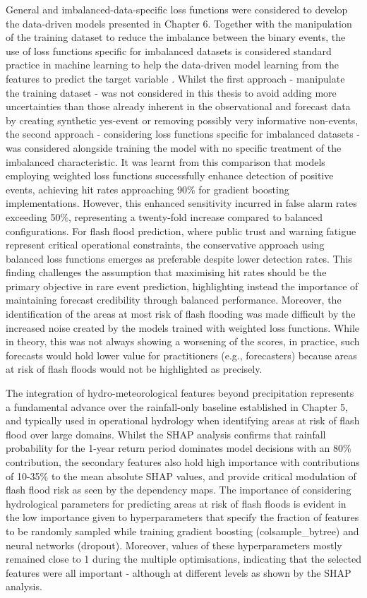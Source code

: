 General and imbalanced-data-specific loss functions were considered to develop the data-driven models presented in Chapter 6. Together with the manipulation of the training dataset to reduce the imbalance between the binary events, the use of loss functions specific for imbalanced datasets is considered standard practice in machine learning to help the data-driven model learning from the features to predict the target variable \citep{Altalhan_2025}. Whilst the first approach - manipulate the training dataset - was not considered in this thesis to avoid adding more uncertainties than those already inherent in the observational and forecast data by creating synthetic yes-event or removing possibly very informative non-events, the second approach - considering loss functions specific for imbalanced datasets - was considered alongside training the model with no specific treatment of the imbalanced characteristic. It was learnt from this comparison that models employing weighted loss functions successfully enhance detection of positive events, achieving hit rates approaching 90\% for gradient boosting implementations. However, this enhanced sensitivity incurred in false alarm rates exceeding 50\%, representing a twenty-fold increase compared to balanced configurations. For flash flood prediction, where public trust and warning fatigue represent critical operational constraints, the conservative approach using balanced loss functions emerges as preferable despite lower detection rates. This finding challenges the assumption that maximising hit rates should be the primary objective in rare event prediction, highlighting instead the importance of maintaining forecast credibility through balanced performance. Moreover, the identification of the areas at most risk of flash flooding was made difficult by the increased noise created by the models trained with weighted loss functions. While in theory, this was not always showing a worsening of the scores, in practice, such forecasts would hold lower value for practitioners (e.g., forecasters) because areas at risk of flash floods would not be highlighted as precisely. 

The integration of hydro-meteorological features beyond precipitation represents a fundamental advance over the rainfall-only baseline established in Chapter 5, and typically used in operational hydrology when identifying areas at risk of flash flood over large domains. Whilst the SHAP analysis confirms that rainfall probability for the 1-year return period dominates model decisions with an 80\% contribution, the secondary features also hold high importance with contributions of 10-35\% to the mean absolute SHAP values, and provide critical modulation of flash flood risk as seen by the dependency maps. The importance of considering hydrological parameters for predicting areas at risk of flash floods is evident in the low importance given to hyperparameters that specify the fraction of features to be randomly sampled while training gradient boosting (colsample\_bytree) and neural networks (dropout). Moreover, values of these hyperparameters mostly remained close to 1 during the multiple optimisations, indicating that the selected features were all important - although at different levels as shown by the SHAP analysis.

